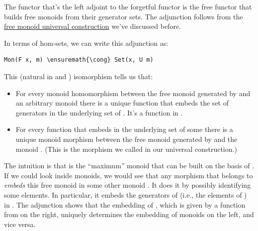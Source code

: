 \noindent
The functor  that's the left adjoint to the forgetful functor
 is the free functor that builds free monoids from their
generator sets. The adjunction follows from the
\hyperref[chap-free-monoids]{free monoid
universal construction} we've discussed before.

In terms of hom-sets, we can write this adjunction as:

\begin{Verbatim}[commandchars=\\\{\}]
Mon(F x, m) \ensuremath{\cong} Set(x, U m)
\end{Verbatim}
This (natural in  and ) isomorphism tells us that:

\begin{itemize}
\tightlist
\item
  For every monoid homomorphism between the free monoid 
  generated by  and an arbitrary monoid  there is a
  unique function that embeds the set of generators  in the
  underlying set of . It's a function in
  .
\item
  For every function that embeds  in the underlying set of
  some  there is a unique monoid morphism between the free
  monoid generated by  and the monoid . (This is the
  morphism we called  in our universal construction.)
\end{itemize}

\begin{figure}[H]
\centering
{}
\end{figure}

\noindent
The intuition is that  is the ``maximum'' monoid that can
be built on the basis of . If we could look inside monoids, we
would see that any morphism that belongs to 
\emph{embeds} this free monoid in some other monoid . It does
it by possibly identifying some elements. In particular, it embeds the
generators of  (i.e., the elements of ) in
. The adjunction shows that the embedding of , which
is given by a function from  on the right,
uniquely determines the embedding of monoids on the left, and vice
versa.

